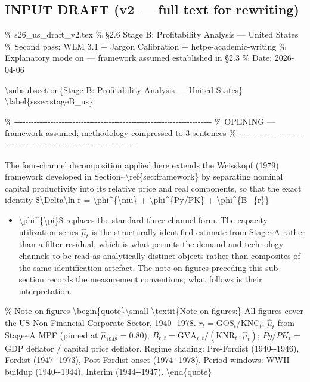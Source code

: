 \subsection{INPUT DRAFT (v2 --- full text for
rewriting)}\label{input-draft-v2--full-text-for-rewriting}

\% s26\_us\_draft\_v2.tex \% §2.6 Stage B: Profitability Analysis ---
United States \% Second pass: WLM 3.1 + Jargon Calibration +
hetpe-academic-writing \% Explanatory mode on --- framework assumed
established in §2.3 \% Date: 2026-04-06

\textbackslash subsubsection\{Stage B: Profitability Analysis --- United
States\} \textbackslash label\{sssec:stageB\_us\}

\%
-\/-\/-\/-\/-\/-\/-\/-\/-\/-\/-\/-\/-\/-\/-\/-\/-\/-\/-\/-\/-\/-\/-\/-\/-\/-\/-\/-\/-\/-\/-\/-\/-\/-\/-\/-\/-\/-\/-\/-\/-\/-\/-\/-\/-\/-\/-\/-\/-\/-\/-\/-\/-\/-\/-\/-\/-\/-\/-\/-\/-\/-\/-\/-\/-\/-\/-\/-\/-\/-\/-
\% OPENING --- framework assumed; methodology compressed to 3 sentences
\%
-\/-\/-\/-\/-\/-\/-\/-\/-\/-\/-\/-\/-\/-\/-\/-\/-\/-\/-\/-\/-\/-\/-\/-\/-\/-\/-\/-\/-\/-\/-\/-\/-\/-\/-\/-\/-\/-\/-\/-\/-\/-\/-\/-\/-\/-\/-\/-\/-\/-\/-\/-\/-\/-\/-\/-\/-\/-\/-\/-\/-\/-\/-\/-\/-\/-\/-\/-\/-\/-\/-

The four-channel decomposition applied here extends the Weisskopf (1979)
framework developed in
Section\textasciitilde\textbackslash ref\{sec:framework\} by separating
nominal capital productivity into its relative price and real
components, so that the exact identity
\$\textbackslash Delta\textbackslash ln r =
\textbackslash phi\^{}\{\textbackslash mu\} +
\textbackslash phi\^{}\{Py/PK\} + \textbackslash phi\^{}\{B\_\{r\}\}

\begin{itemize}
\tightlist
\item
  \textbackslash phi\^{}\{\textbackslash pi\}\$ replaces the standard
  three-channel form. The capacity utilization series \(\hat{\mu}_{t}\)
  is the structurally identified estimate from Stage\textasciitilde A
  rather than a filter residual, which is what permits the demand and
  technology channels to be read as analytically distinct objects rather
  than composites of the same identification artefact. The note on
  figures preceding this sub-section records the measurement
  conventions; what follows is their interpretation.
\end{itemize}

\% Note on figures \textbackslash begin\{quote\}\textbackslash small
\textbackslash textit\{Note on figures:\} All figures cover the US
Non-Financial Corporate Sector, 1940-\/-1978.
\(r_{t} = \text{GOS}_{t}/\text{KNC}_{t}\); \(\hat{\mu}_{t}\) from
Stage\textasciitilde A MPF (pinned at \(\hat{\mu}_{1948} = 0.80\));
\(B_{r,t} = \text{GVA}_{r,t}/(\text{KNR}_{t}\cdot\hat{\mu}_{t})\);
\(Py/PK_{t}\) = GDP deflator / capital price deflator. Regime shading:
Pre-Fordist (1940-\/-1946), Fordist (1947-\/-1973), Post-Fordist onset
(1974-\/-1978). Period windows: WWII buildup (1940-\/-1944), Interim
(1944-\/-1947). \textbackslash end\{quote\}

